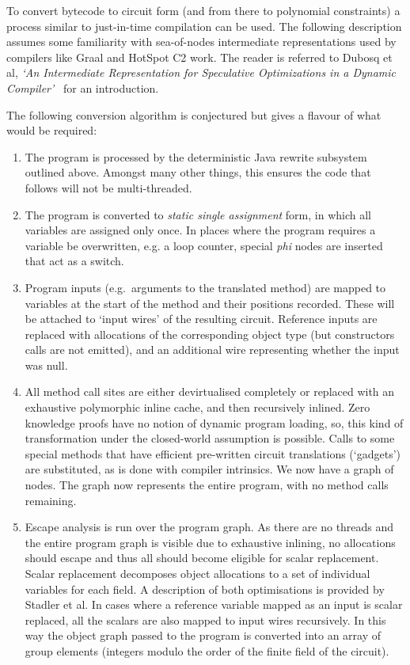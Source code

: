 \documentclass{article}
\begin{document}
To convert bytecode to circuit form (and from there to polynomial constraints) a process similar to just-in-time
compilation can be used. The following description assumes some familiarity with sea-of-nodes intermediate
representations used by compilers like Graal and HotSpot C2 work. The reader is referred to Dubosq et al,
\emph{`An Intermediate Representation for Speculative Optimizations in a Dynamic Compiler'}~\cite{Duboscq:2013:IRS:2542142.2542143}
for an introduction.

The following conversion algorithm is conjectured but gives a flavour of what would be required:

\begin{enumerate}

    \item The program is processed by the deterministic Java rewrite subsystem outlined above. Amongst many
    other things, this ensures the code that follows will not be multi-threaded.

    \item The program is converted to \emph{static single assignment} form, in which all variables are assigned
    only once. In places where the program requires a variable be overwritten, e.g. a loop counter, special
    \emph{phi} nodes are inserted that act as a switch.

    \item Program inputs (e.g.\ arguments to the translated method) are mapped to variables at the start of
    the method and their positions recorded. These will be attached to `input wires' of the resulting
    circuit. Reference inputs are replaced with allocations of the corresponding object type (but constructors
    calls are not emitted), and an additional wire representing whether the input was null.

    \item All method call sites are either devirtualised completely or replaced with an exhaustive polymorphic
    inline cache, and then recursively inlined. Zero knowledge proofs have no notion of dynamic program loading,
    so, this kind of transformation under the closed-world assumption is possible. Calls to some special methods
    that have efficient pre-written circuit translations (`gadgets') are substituted, as is done with compiler
    intrinsics. We now have a graph of nodes. The graph now represents the entire program, with no method calls
    remaining.

    \item Escape analysis is run over the program graph. As there are no threads and the entire program graph is
    visible due to exhaustive inlining, no allocations should escape and thus all should become eligible for scalar
    replacement. Scalar replacement decomposes object allocations to a set of individual variables for each field.
    A description of both optimisations is provided by Stadler et al\cite{Stadler:2014:PEA:2581122.2544157}. In cases
    where a reference variable mapped as an input is scalar replaced, all the scalars are also mapped to input
    wires recursively. In this way the object graph passed to the program is converted into an array of
    group elements (integers modulo the order of the finite field of the circuit).


\end{enumerate}
\end{document}

